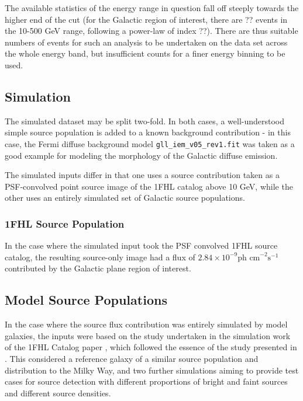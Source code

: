 \documentclass{PoS}
\begin{document}
The available statistics of the energy range in question fall off steeply towards the higher end of the cut (for the Galactic region of interest, there are ?? events in the 10-500 GeV range, following a power-law of index ??). There are thus suitable numbers of events for such an analysis to be undertaken on the data set across the whole energy band, but insufficient counts for a finer energy binning to be used.

\subsection{Simulation}

The simulated dataset may be split two-fold. In both cases, a well-understood simple source population is added to a known background contribution - in this case, the Fermi diffuse background model \verb|gll_iem_v05_rev1.fit| was taken as a good example for modeling the morphology of the Galactic diffuse emission.

The simulated inputs differ in that one uses a source contribution taken as a PSF-convolved point source image of the 1FHL catalog above 10 GeV, while the other uses an entirely simulated set of Galactic source populations.

\subsubsection{1FHL Source Population}

In the case where the simulated input took the PSF convolved 1FHL source catalog, the resulting source-only image had a flux of $2.84\times 10^{-9} \text{ph cm}^{-2}\text{s}^{-1}$ contributed by the Galactic plane region of interest.

\subsection{Model Source Populations}

In the case where the source flux contribution was entirely simulated by model galaxies, the inputs were based on the study undertaken in the simulation work of the 1FHL Catalog paper \cite[p.59]{1fhl}, which followed the essence of the study presented in \cite{Strong}. This considered a reference galaxy of a similar source population and distribution to the Milky Way, and two further simulations aiming to provide test cases for source detection with different proportions of bright and faint sources and different source densities.
\end{document}
